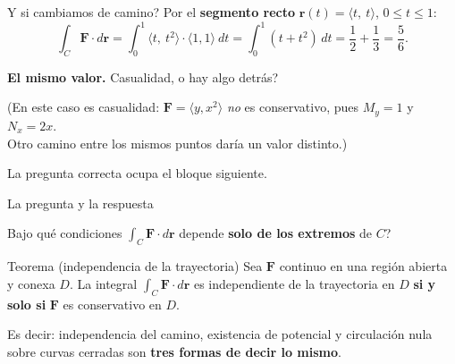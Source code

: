 \documentclass[11pt,aspectratio=169]{beamer}
\begin{document}
\begin{frame}{\textquestiondown{}Y si cambiamos de camino?}
  Por el \textbf{segmento recto} $\mathbf r(t)=\langle t,\ t\rangle$, $0\le t\le1$:
  \[
    \int_C \mathbf F\cdot d\mathbf r
    = \int_0^1 \langle t,\ t^2\rangle\cdot\langle 1,1\rangle\ dt
    = \int_0^1 (t+t^2)\,dt
    = \frac12+\frac13 = \frac56.
  \]
  \pause
  \vspace{4pt}
  \begin{center}
  \normalsize\color{tealx} \textbf{El mismo valor.} \textquestiondown{}Casualidad, o hay algo detrás?
  \end{center}
  \pause
  \vspace{8pt}
  \begin{center}\small\color{gray60}
  (En este caso es casualidad: $\mathbf F=\langle y,x^2\rangle$ \emph{no} es conservativo, pues $M_y=1$ y $N_x=2x$.\\
  Otro camino entre los mismos puntos daría un valor distinto.)
  \end{center}
  \pause
  \vspace{4pt}
  \begin{center}
  \normalsize La pregunta correcta ocupa el bloque siguiente.
  \end{center}
\end{frame}


\begin{frame}{La pregunta y la respuesta}
  \begin{center}
  \normalsize
  \textquestiondown{}Bajo qué condiciones $\displaystyle\int_C \mathbf F\cdot d\mathbf r$ depende \textbf{solo de los extremos} de $C$?
  \end{center}
  \vspace{10pt}
  \pause
  \begin{block}{Teorema (independencia de la trayectoria)}
    Sea $\mathbf F$ continuo en una región abierta y conexa $D$. La integral $\int_C \mathbf F\cdot d\mathbf r$ es independiente de la trayectoria en $D$ \textbf{si y solo si} $\mathbf F$ es conservativo en $D$.
  \end{block}
  \pause
  \vspace{6pt}
  \begin{center}\small\color{gray60}
  Es decir: independencia del camino, existencia de potencial y circulación nula sobre curvas cerradas son \textbf{tres formas de decir lo mismo}.
  \end{center}
\end{frame}
\end{document}
